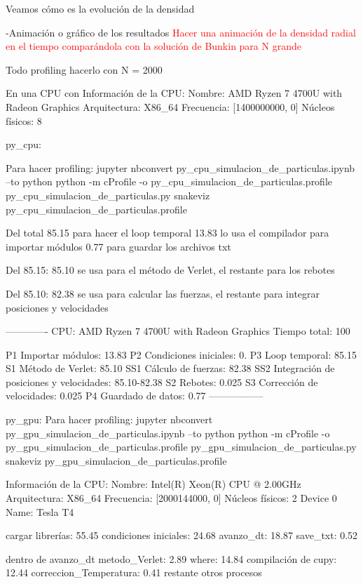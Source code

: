 \documentclass[aps,prb,twocolumn,superscriptaddress,floatfix,longbibliography]{revtex4-2}
\newcounter{para}
\begin{document}
\begin{itemize}
Veamos cómo es la evolución de la densidad

-Animación o gráfico de los resultados
\textcolor{red}{Hacer una animación de la densidad radial en el tiempo comparándola con la solución de Bunkin para N grande}



Todo profiling hacerlo con N = 2000

En una CPU con
Información de la CPU:
Nombre: AMD Ryzen 7 4700U with Radeon Graphics
Arquitectura: X86_64
Frecuencia: [1400000000, 0]
Núcleos físicos: 8

py_cpu:

Para hacer profiling:
jupyter nbconvert py_cpu_simulacion_de_particulas.ipynb --to python
python -m cProfile -o py_cpu_simulacion_de_particulas.profile py_cpu_simulacion_de_particulas.py
snakeviz py_cpu_simulacion_de_particulas.profile

Del total
85.15 para hacer el loop temporal
13.83 lo usa el compilador para importar módulos
0.77 para guardar los archivos txt

Del 85.15:
85.10 se usa para el método de Verlet, el restante para los rebotes

Del 85.10:
82.38 se usa para calcular las fuerzas, el restante para integrar posiciones y velocidades

-------------
CPU: AMD Ryzen 7 4700U with Radeon Graphics
Tiempo total: 100

P1 Importar módulos: 13.83
P2 Condiciones iniciales: 0.
P3 Loop temporal: 85.15
S1 Método de Verlet: 85.10
SS1 Cálculo de fuerzas: 82.38
SS2 Integración de posiciones y velocidades: 85.10-82.38
S2 Rebotes: 0.025
S3 Corrección de velocidades: 0.025
P4 Guardado de datos: 0.77
-----------------




py_gpu:
Para hacer profiling:
jupyter nbconvert py_gpu_simulacion_de_particulas.ipynb --to python
python -m cProfile -o py_gpu_simulacion_de_particulas.profile py_gpu_simulacion_de_particulas.py
snakeviz py_gpu_simulacion_de_particulas.profile

Información de la CPU:
Nombre: Intel(R) Xeon(R) CPU @ 2.00GHz
Arquitectura: X86_64
Frecuencia: [2000144000, 0]
Núcleos físicos: 2
Device 0 Name: Tesla T4

cargar librerías: 55.45 %
condiciones iniciales: 24.68%
avanzo_dt: 18.87 %
save_txt: 0.52 %

dentro de avanzo_dt
metodo_Verlet: 2.89%
where: 14.84 %
compilación de cupy: 12.44 %
correccion_Temperatura: 0.41%
restante otros procesos



\end{itemize}
\end{document}
